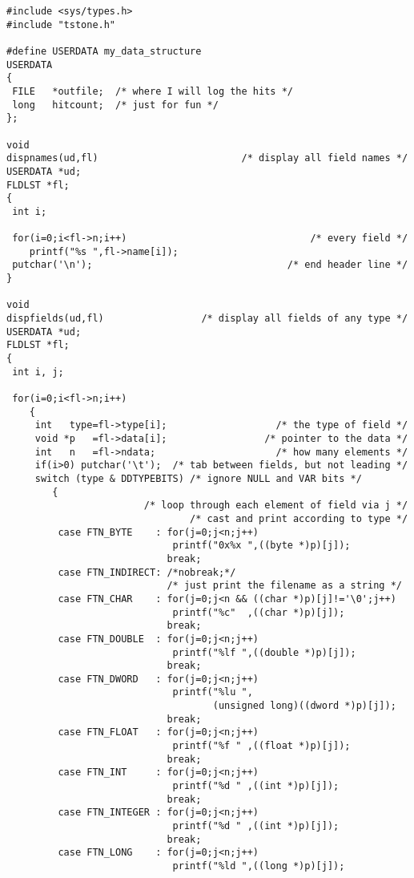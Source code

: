 \EXAMPLE
\begin{verbatim}
#include <sys/types.h>
#include "tstone.h"

#define USERDATA my_data_structure
USERDATA
{
 FILE   *outfile;  /* where I will log the hits */
 long   hitcount;  /* just for fun */
};

void
dispnames(ud,fl)                         /* display all field names */
USERDATA *ud;
FLDLST *fl;
{
 int i;

 for(i=0;i<fl->n;i++)                                /* every field */
    printf("%s ",fl->name[i]);
 putchar('\n');                                  /* end header line */
}

void
dispfields(ud,fl)                 /* display all fields of any type */
USERDATA *ud;
FLDLST *fl;
{
 int i, j;

 for(i=0;i<fl->n;i++)
    {
     int   type=fl->type[i];                   /* the type of field */
     void *p   =fl->data[i];                 /* pointer to the data */
     int   n   =fl->ndata;                     /* how many elements */
     if(i>0) putchar('\t');  /* tab between fields, but not leading */
     switch (type & DDTYPEBITS) /* ignore NULL and VAR bits */
        {
                        /* loop through each element of field via j */
                                /* cast and print according to type */
         case FTN_BYTE    : for(j=0;j<n;j++)
                             printf("0x%x ",((byte *)p)[j]);
                            break;
         case FTN_INDIRECT: /*nobreak;*/
                            /* just print the filename as a string */
         case FTN_CHAR    : for(j=0;j<n && ((char *)p)[j]!='\0';j++)
                             printf("%c"  ,((char *)p)[j]);
                            break;
         case FTN_DOUBLE  : for(j=0;j<n;j++)
                             printf("%lf ",((double *)p)[j]);
                            break;
         case FTN_DWORD   : for(j=0;j<n;j++)
                             printf("%lu ",
                                    (unsigned long)((dword *)p)[j]);
                            break;
         case FTN_FLOAT   : for(j=0;j<n;j++)
                             printf("%f " ,((float *)p)[j]);
                            break;
         case FTN_INT     : for(j=0;j<n;j++)
                             printf("%d " ,((int *)p)[j]);
                            break;
         case FTN_INTEGER : for(j=0;j<n;j++)
                             printf("%d " ,((int *)p)[j]);
                            break;
         case FTN_LONG    : for(j=0;j<n;j++)
                             printf("%ld ",((long *)p)[j]);

\end{verbatim}
